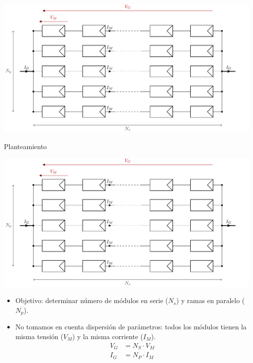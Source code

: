 \documentclass[aspectratio=169, usenames,svgnames,dvipsnames]{beamer}
\begin{document}
\begin{frame}[label={sec:org131622f},plain]{}
\begin{center}
\includegraphics[height=0.9\textheight]{../figs/ConfiguracionGenerador.pdf}
\end{center}
\end{frame}
\begin{frame}[label={sec:org282d1cf},plain]{Planteamiento}
\begin{center}
\includegraphics[height=0.5\textheight]{../figs/ConfiguracionGenerador.pdf}
\end{center}

\begin{itemize}
\item \alert{Objetivo}: determinar número de módulos en serie (\(N_s\)) y ramas en paralelo (\(N_p\)).
\item No tomamos en cuenta dispersión de parámetros: todos los módulos tienen la \alert{misma tensión} (\(V_M\)) y la \alert{misma corriente} (\(I_M\)).
\begin{align*}
  V_G &= N_S \cdot V_M\\
  I_G &= N_P \cdot I_M
\end{align*}
\end{itemize}
\end{frame}
\end{document}
